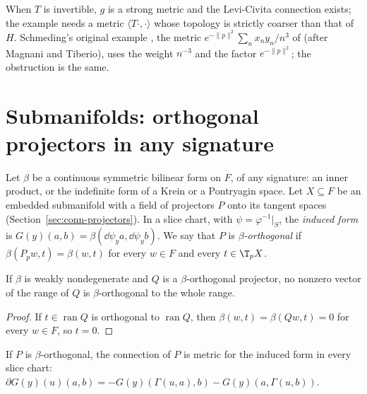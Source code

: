 When $T$ is invertible, $g$ is a strong metric and the Levi-Civita connection exists; the
example needs a metric $\langle T\cdot, \cdot\rangle$ whose topology is strictly coarser than
that of $H$. Schmeding's original example \cite[Example~4.22]{Sch23}, the metric
$e^{-\|p\|^2} \sum_n x_n y_n / n^3$ of \cite[Example~4.12]{Sch23} (after Magnani and Tiberio), uses
the weight $n^{-3}$ and the factor $e^{-\|p\|^2}$; the obstruction is the same.

\section{Submanifolds: orthogonal projectors in any signature}
\label{sec:mt-projector-metric}

Let $\beta$ be a continuous symmetric bilinear form on $F$, of any signature: an inner product,
or the indefinite form of a Krein or a Pontryagin space. Let $X \subseteq F$ be an embedded
submanifold with a field of projectors $P$ onto its tangent spaces
(Section~\ref{sec:conn-projectors}). In a slice chart, with $\psi = \varphi^{-1}|_S$, the
\emph{induced form} is $G(y)(a, b) = \beta(\dd\psi_y a, \dd\psi_y b)$. We say that $P$ is
\emph{$\beta$-orthogonal} if $\beta(P_p w, t) = \beta(w, t)$ for every $w \in F$ and every
$t \in \T_p X$.

\begin{lemma}
  \label{lem:mt-orth-nondegenerate}
  \leanok
  If $\beta$ is weakly nondegenerate and $Q$ is a $\beta$-orthogonal projector, no nonzero vector
  of the range of $Q$ is $\beta$-orthogonal to the whole range.
\end{lemma}

\begin{proof}
  \leanok
  If $t \in \operatorname{ran} Q$ is orthogonal to $\operatorname{ran} Q$, then
  $\beta(w, t) = \beta(Qw, t) = 0$ for every $w \in F$, so $t = 0$.
\end{proof}

\begin{theorem}
  \label{thm:mt-gauss}
  \leanok
  If $P$ is $\beta$-orthogonal, the connection of $P$ is metric for the induced form in every
  slice chart:
  $\partial G(y)(u)(a, b) = -G(y)(\Gamma(u, a), b) - G(y)(a, \Gamma(u, b))$.
\end{theorem}


